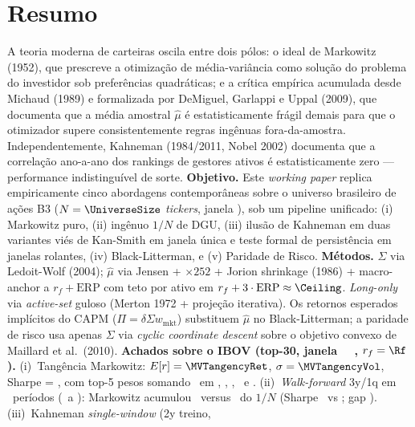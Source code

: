 \documentclass[12pt,a4paper,oneside]{article}
\begin{document}
\section*{Resumo}
\begin{singlespace}\small\noindent
A teoria moderna de carteiras oscila entre dois pólos: o ideal de
Markowitz (1952), que prescreve a otimização de média-variância como
solução do problema do investidor sob preferências quadráticas; e a
crítica empírica acumulada desde Michaud (1989) e formalizada por
DeMiguel, Garlappi e Uppal (2009), que documenta que a média amostral
$\hat{\mu}$ é estatisticamente frágil demais para que o otimizador
supere consistentemente regras ingênuas fora-da-amostra.
Independentemente, Kahneman (1984/2011, Nobel 2002) documenta que a
correlação ano-a-ano dos rankings de gestores ativos é
estatisticamente zero — performance indistinguível de sorte.
\textbf{Objetivo.} Este \textit{working paper} replica empiricamente
cinco abordagens contemporâneas sobre o universo brasileiro de ações
B3 ($N = \UniverseSize$ \textit{tickers}, janela
\UniverseDates), sob um pipeline unificado: (i) Markowitz puro,
(ii) ingênuo $1/N$ de DGU, (iii) ilusão de Kahneman em duas
variantes \textemdash{} viés de Kan-Smith em janela única e teste
formal de persistência em janelas rolantes, (iv) Black-Litterman, e
(v) Paridade de Risco. \textbf{Métodos.} $\Sigma$ via Ledoit-Wolf (2004);
$\hat{\mu}$ via Jensen + $\times 252$ + Jorion shrinkage (1986) + macro-anchor a $r_f
+ \mathrm{ERP}$ com teto por ativo em $r_f + 3 \cdot \mathrm{ERP}
\approx \Ceiling$. \textit{Long-only} via \textit{active-set} guloso
(Merton 1972 + projeção iterativa). Os retornos esperados implícitos
do CAPM ($\Pi = \delta \Sigma w_{\mathrm{mkt}}$) substituem $\hat{\mu}$
no Black-Litterman; a paridade de risco usa apenas $\Sigma$ via
\textit{cyclic coordinate descent} sobre o objetivo convexo de
Maillard et al.\ (2010).
\textbf{Achados sobre o IBOV (top-30, janela
\MVPeriodStart\ \textendash\ \MVPeriodEnd, $r_f = \Rf$).}
(i)~Tangência Markowitz: $E[r] = \MVTangencyRet$, $\sigma =
\MVTangencyVol$, Sharpe = \MVTangencySharpe, com top-5 pesos somando
\MVTopFiveSumWeights\ em \MVTopOneTicker, \MVTopTwoTicker, \MVTopThreeTicker,
\MVTopFourTicker\ e \MVTopFiveTicker.
(ii)~\textit{Walk-forward} 3y/1q em \IngenuoPeriods\ períodos
(\IngenuoPeriodStart\ a \IngenuoPeriodEnd): Markowitz acumulou
\IngenuoMVCumReturn\ versus \IngenuoEQCumReturn\ do $1/N$
(Sharpe \IngenuoMVSharpe\ vs \IngenuoEQSharpe; gap \IngenuoSharpeGap).
(iii)~Kahneman \textit{single-window} (2y treino,

\end{singlespace}
\end{document}
